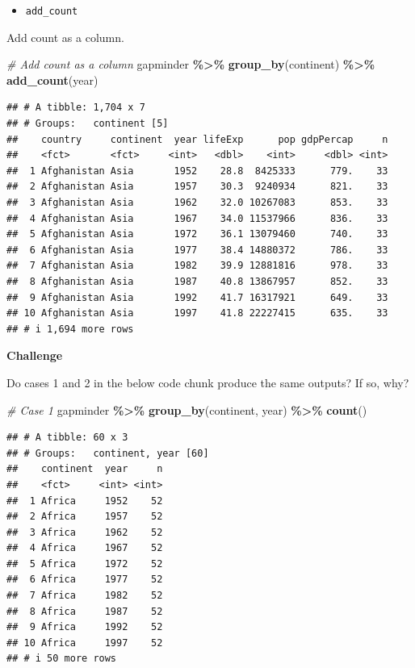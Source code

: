 \documentclass[
]{book}
\newenvironment{Shaded}{\begin{snugshade}}{\end{snugshade}}
\newcommand{\CommentTok}[1]{\textcolor[rgb]{0.56,0.35,0.01}{\textit{#1}}}
\newcommand{\FunctionTok}[1]{\textcolor[rgb]{0.13,0.29,0.53}{\textbf{#1}}}
\newcommand{\NormalTok}[1]{#1}
\newcommand{\SpecialCharTok}[1]{\textcolor[rgb]{0.81,0.36,0.00}{\textbf{#1}}}
\providecommand{\tightlist}{%
  \setlength{\itemsep}{0pt}\setlength{\parskip}{0pt}}
\begin{document}
\begin{itemize}
\tightlist
\item
  \texttt{add\_count}
\end{itemize}

Add count as a column.

\begin{Shaded}
\begin{Highlighting}[]
\CommentTok{\# Add count as a column}
\NormalTok{gapminder }\SpecialCharTok{\%\textgreater{}\%}
  \FunctionTok{group\_by}\NormalTok{(continent) }\SpecialCharTok{\%\textgreater{}\%}
  \FunctionTok{add\_count}\NormalTok{(year)}
\end{Highlighting}
\end{Shaded}

\begin{verbatim}
## # A tibble: 1,704 x 7
## # Groups:   continent [5]
##    country     continent  year lifeExp      pop gdpPercap     n
##    <fct>       <fct>     <int>   <dbl>    <int>     <dbl> <int>
##  1 Afghanistan Asia       1952    28.8  8425333      779.    33
##  2 Afghanistan Asia       1957    30.3  9240934      821.    33
##  3 Afghanistan Asia       1962    32.0 10267083      853.    33
##  4 Afghanistan Asia       1967    34.0 11537966      836.    33
##  5 Afghanistan Asia       1972    36.1 13079460      740.    33
##  6 Afghanistan Asia       1977    38.4 14880372      786.    33
##  7 Afghanistan Asia       1982    39.9 12881816      978.    33
##  8 Afghanistan Asia       1987    40.8 13867957      852.    33
##  9 Afghanistan Asia       1992    41.7 16317921      649.    33
## 10 Afghanistan Asia       1997    41.8 22227415      635.    33
## # i 1,694 more rows
\end{verbatim}

\textbf{Challenge}

Do cases 1 and 2 in the below code chunk produce the same outputs? If so, why?

\begin{Shaded}
\begin{Highlighting}[]
\CommentTok{\# Case 1}
\NormalTok{gapminder }\SpecialCharTok{\%\textgreater{}\%}
  \FunctionTok{group\_by}\NormalTok{(continent, year) }\SpecialCharTok{\%\textgreater{}\%}
  \FunctionTok{count}\NormalTok{()}
\end{Highlighting}
\end{Shaded}

\begin{verbatim}
## # A tibble: 60 x 3
## # Groups:   continent, year [60]
##    continent  year     n
##    <fct>     <int> <int>
##  1 Africa     1952    52
##  2 Africa     1957    52
##  3 Africa     1962    52
##  4 Africa     1967    52
##  5 Africa     1972    52
##  6 Africa     1977    52
##  7 Africa     1982    52
##  8 Africa     1987    52
##  9 Africa     1992    52
## 10 Africa     1997    52
## # i 50 more rows
\end{verbatim}
\end{document}
